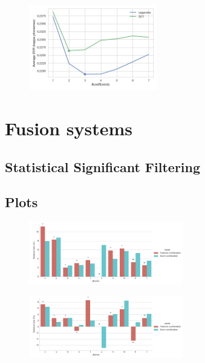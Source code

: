 \begin{figure}[H]
	\centering
	\includegraphics[width=0.5\textwidth]{files/figures/results/legendre-dct/legendre-dct-coefficients.png}
\end{figure}


\section{Fusion systems}

\subsection{Statistical Significant Filtering}

\subsection{Plots}

\begin{figure}[H]
	\centering
	\includegraphics[width=0.6\textwidth]{files/figures/results/relatives/relatives-fusion-systems-dev-mcnemar.png}
\end{figure}

\begin{figure}[H]
	\centering
	\includegraphics[width=0.6\textwidth]{files/figures/results/relatives/relative-fusion-systems-heldout-mcnemar.png}
\end{figure}
